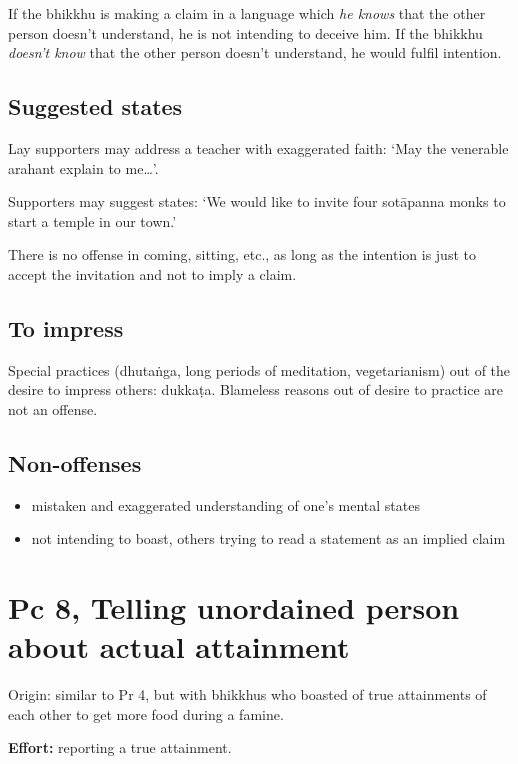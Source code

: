 If the bhikkhu is making a claim in a language which \emph{he knows}
that the other person doesn't understand, he is not intending to deceive
him. If the bhikkhu \emph{doesn't know} that the other person doesn't
understand, he would fulfil intention.

\subsection{Suggested states}

Lay supporters may address a teacher with exaggerated faith: `May the
venerable arahant explain to me\ldots{}'.

Supporters may suggest states: `We would like to invite four sotāpanna
monks to start a temple in our town.'

There is no offense in coming, sitting, etc., as long as the intention
is just to accept the invitation and not to imply a claim.

\subsection{To impress}

Special practices (dhutaṅga, long periods of meditation, vegetarianism)
out of the desire to impress others: dukkaṭa. Blameless reasons out of
desire to practice are not an offense.

\subsection{Non-offenses}

\begin{itemize}
\tightlist
\item
  mistaken and exaggerated understanding of one's mental states
\item
  not intending to boast, others trying to read a statement as an
  implied claim
\end{itemize}

\clearpage

\section{Pc 8, Telling unordained person about actual attainment}

Origin: similar to Pr 4, but with bhikkhus who boasted of true
attainments of each other to get more food during a famine.

\textbf{Effort:} reporting a true attainment.

